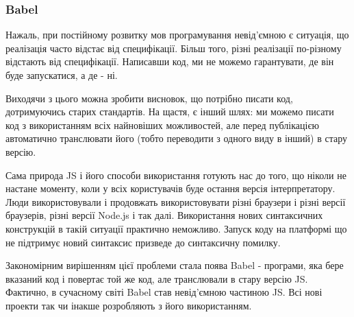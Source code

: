 \subsubsection{Babel}

Нажаль, при постійному розвитку мов програмування невід'ємною є ситуація, що реалізація часто відстає від специфікації. Більш того, різні реалізації по-різному відстають від специфікації. Написавши код, ми не можемо гарантувати, де він буде запускатися, а де - ні.

Виходячи з цього можна зробити висновок, що потрібно писати код, дотримуючись старих стандартів. На щастя, є інший шлях: ми можемо писати код з використанням всіх найновіших можливостей, але перед публікацією автоматично транслювати його (тобто переводити з одного виду в інший) в стару версію. 

Сама природа JS і його способи використання готують нас до того, що ніколи не настане моменту, коли у всіх користувачів буде остання версія інтерпретатору. Люди використовували і продовжать використовувати різні браузери і різні версії браузерів, різні версії Node.js і так далі. Використання нових синтаксичних конструкцій в такій ситуації практично неможливо. Запуск коду на платформі що не підтримує новий синтаксис призведе до синтаксичну помилку. 

Закономірним вирішенням цієї проблеми стала поява Babel - програми, яка бере вказаний код і повертає той же код, але транслювали в стару версію JS. Фактично, в сучасному світі Babel став невід'ємною частиною JS. Всі нові проекти так чи інакше розробляють з його використанням.
